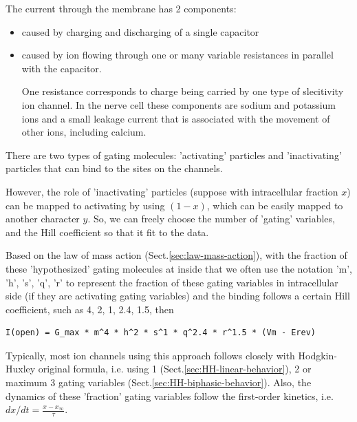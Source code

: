 The current through the membrane has 2 components:
\begin{itemize}
  \item caused by charging and discharging of a single capacitor

  \item caused by ion flowing through one or many variable resistances in
  parallel with the capacitor.

One resistance corresponds to charge being carried by one type of
slecitivity ion channel. In the nerve cell these components are sodium and
potassium ions and a small leakage current that is associated with the movement
of other ions, including calcium.
\end{itemize}



\begin{mdframed}

There are two types of gating molecules: 'activating' particles and
'inactivating' particles that can bind to the sites on the channels.

However, the role of 'inactivating' particles (suppose with intracellular
fraction $x$) can be mapped to activating by using $(1-x)$, which can be easily
mapped to another character $y$. So, we can freely choose the number of 'gating'
variables, and the Hill coefficient so that it fit to the data.

\end{mdframed}

Based on the law of mass action (Sect.\ref{sec:law-mass-action}), with the
fraction of these 'hypothesized' gating molecules at inside that we often use
the notation 'm', 'h', 's', 'q', 'r' to represent the fraction of these gating
variables in intracellular side (if they are activating gating variables) and
the binding follows a certain Hill coefficient, such as 4, 2, 1, 2.4, 1.5, then
\begin{verbatim}
I(open) = G_max * m^4 * h^2 * s^1 * q^2.4 * r^1.5 * (Vm - Erev)
\end{verbatim}


Typically, most ion channels using this approach follows closely with
Hodgkin-Huxley original formula, i.e. using 1
(Sect.\ref{sec:HH-linear-behavior}), 2 or maximum 3 gating variables
(Sect.\ref{sec:HH-biphasic-behavior}).
Also, the dynamics of these 'fraction' gating variables follow the first-order
kinetics, i.e. $dx/dt = \frac{x-x_\infty}{\tau}$.


